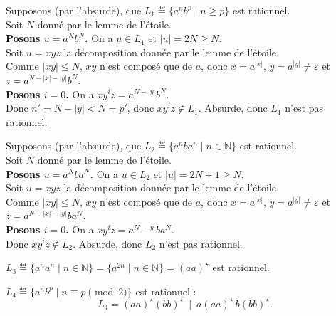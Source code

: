 \begin{corrections}

  \begin{questions}

  \item Supposons (par l'absurde), que $L_1 \eqdef \{a^n b^p \mid n\ge p\}$ est rationnel.\\
    Soit $N$ donné par le lemme de l'étoile.\\
    \textbf{Posons $u=a^N b^N$.} On a $u\in L_1$ et $|u|=2N\ge N$.\\
    Soit $u=xyz$ la décomposition donnée par le lemme de l'étoile.\\
    Comme $|xy|\le N$, $xy$ n'est composé que de $a$, donc $x=a^{|x|}$, $y=a^{|y|}\neq\varepsilon$ et $z=a^{N-|x|-|y|}b^N$.\\
    \textbf{Posons $i=0$.} On a $xy^iz=a^{N-|y|}b^N$.\\
    Donc $n'=N-|y| < N=p'$, donc $xy^iz \notin L_1$. Absurde, donc $L_1$ n'est pas rationnel.

  \item Supposons (par l'absurde), que $L_2 \eqdef \{a^n b a^n \mid n\in\mathbb{N}\}$ est rationnel.\\
    Soit $N$ donné par le lemme de l'étoile.\\
    \textbf{Posons $u=a^N b a^N$.} On a $u\in L_2$ et $|u|=2N+1\ge N$.\\
    Soit $u=xyz$ la décomposition donnée par le lemme de l'étoile.\\
    Comme $|xy|\le N$, $xy$ n'est composé que de $a$, donc $x=a^{|x|}$, $y=a^{|y|}\neq\varepsilon$ et $z=a^{N-|x|-|y|} b a^N$.\\
    \textbf{Posons $i=0$.} On a $xy^iz=a^{N-|y|} b a^N$.\\
    Donc $xy^iz \notin L_2$. Absurde, donc $L_2$ n'est pas rationnel.

  \item $L_3 \eqdef \{a^n a^n \mid n\in\mathbb{N}\} = \{a^{2n}\mid n\in\mathbb{N}\} = (aa)^\star$ est rationnel.

  \item $L_4 \eqdef \{a^n b^p \mid n\equiv p \!\!\!\pmod 2\}$ est rationnel :
    \[
      L_4 = (aa)^\star (bb)^\star \ \mid\ a(aa)^\star\, b(bb)^\star.
    \]


\end{questions}
\end{corrections}
